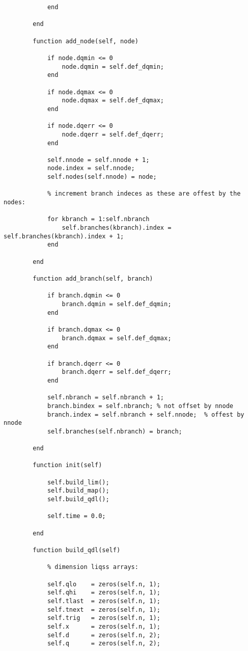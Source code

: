 \begin{lstlisting}
            end
            
        end
    
        function add_node(self, node)

            if node.dqmin <= 0
                node.dqmin = self.def_dqmin;
            end
            
            if node.dqmax <= 0
                node.dqmax = self.def_dqmax;
            end
            
            if node.dqerr <= 0
                node.dqerr = self.def_dqerr;
            end
            
            self.nnode = self.nnode + 1;
            node.index = self.nnode;
            self.nodes(self.nnode) = node;
            
            % increment branch indeces as these are offest by the nodes:
            
            for kbranch = 1:self.nbranch
                self.branches(kbranch).index = self.branches(kbranch).index + 1;
            end

        end
        
        function add_branch(self, branch)
            
            if branch.dqmin <= 0
                branch.dqmin = self.def_dqmin;
            end
            
            if branch.dqmax <= 0
                branch.dqmax = self.def_dqmax;
            end
            
            if branch.dqerr <= 0
                branch.dqerr = self.def_dqerr;
            end
            
            self.nbranch = self.nbranch + 1;
            branch.bindex = self.nbranch; % not offset by nnode
            branch.index = self.nbranch + self.nnode;  % offest by nnode
            self.branches(self.nbranch) = branch;
            
        end
        
        function init(self)
            
            self.build_lim();  
            self.build_map();
            self.build_qdl();

            self.time = 0.0;
  
        end
        
        function build_qdl(self)
            
            % dimension liqss arrays:
            
            self.qlo    = zeros(self.n, 1);
            self.qhi    = zeros(self.n, 1);     
            self.tlast  = zeros(self.n, 1);
            self.tnext  = zeros(self.n, 1);
            self.trig   = zeros(self.n, 1);
            self.x      = zeros(self.n, 1);
            self.d      = zeros(self.n, 2);
            self.q      = zeros(self.n, 2);  


\end{lstlisting}
